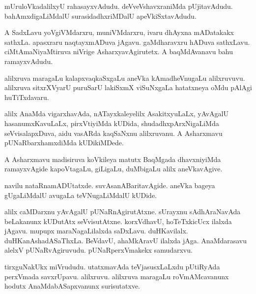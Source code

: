 \documentclass{article}
\begin{document}
\begin{mn}%
mUruloVkadalilxyU rahasayxvAdudu. deVveVshavxraniMda pUjitavAdudu. bahAmxdigaLiMdalU 
surasidadhxriMDalU apeVkiSxtavAdudu.
\end{mn}

\begin{mn}%
A SadxLavu yoVgiVMdarxru, muniVMdarxru, ivaru dhAyxna mADatakakx sathxLa. apasxraru 
naqtayxmADuva jAgavu. gaMdharavxru hADuva sathxLavu. ciMtAmaNiyaMtiruva niVrige 
AsharxyavAgirutetx. A baqMdAvanavu bahu ramayxvAdudu.
\end{mn}

\begin{mn}%
alilxruva maragaLu kalapxvaqkaSxgaLu aneVka kAmadheVnugaLu alilxruvuvu. alilxruva 
sitxrXVyarU puruSarU lakiSxmX viSuNxgaLa hatatxneya oMdu pAlAgi huTiTxdavaru.
\end{mn}

\begin{mn}%
alilx AnaMda vigarxhavAda, nATayxkaleyelilx AsakitxyuLaLx, yAvAgalU hasanumxKavuLaLx, 
pirxVtiyiMda kUDida, shudadhxpArxNigaLiMda seVvisalapxDuva, aidu vasARda kaqSaNxnu 
alilxruvanu. A Asharxmavu pUNaRbarxhamxdiMda kUDikiMDede.
\end{mn}

\begin{mn}%
A Asharxmavu madisiruva koVkileya matutx BaqMgada dhavxniyiMda ramayxvAgide kapoVtagaLu, 
giLigaLu, duMbigaLu alilx aneVkavAgive.
\end{mn}

\begin{mn}%
navilu nataRnamADUtatxde. suvAsanABaritavAgide. aneVka bageya gUgaLiMdalU avugaLa 
teVNugaLiMdalU kUDide.
\end{mn}

\begin{mn}%
alilx caMDarxnu yAvAgalU pUNaRnAgirutAtxne. sUrayxnu sAdhAraNavAda beLakanunx kUDutAtx 
seVvisutAtxne. korxVdhavU, hoTeTxkicUcx ilalxda jAgavu. mupupx maraNagaLilalxda saDxLavu. 
duHKavilalx. duHKanAshadASaThxLa. BeVdavU, ahaMkAravU ilalxda jAga. AnaMdarasavu alelxV 
pUNaRvAgiruvudu. pUNaRperxVmakekx samudarxvu.
\end{mn}

\begin{mn}%
tirxguNakUkx miVrududu. utatxmavAda teVjasusxLaLxdu pUtiRyAda perxVmada savxrUpavu. 
alilxruvu. alilxruva maragaLu roVmAMcavanunx hodutx AnaMdabASapxvanunx surisutatxve.
\end{mn}
\end{document}
